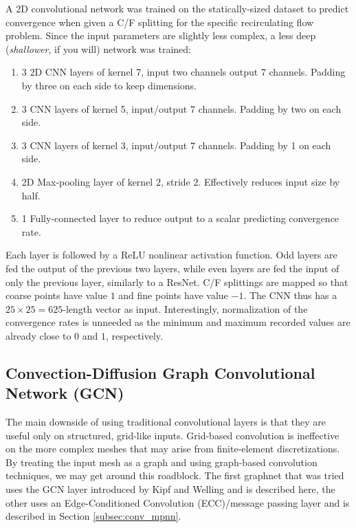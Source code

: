 \documentclass[review]{siamart190516}
\begin{document}
A 2D convolutional network was trained on the statically-sized dataset to predict convergence when given a C/F splitting for the specific recirculating flow problem.  Since the input parameters are slightly less complex, a less deep (\textit{shallower}, if you will) network was trained:

\begin{enumerate}
\item 3 2D CNN layers of kernel 7, input two channels output 7 channels.  Padding by three on each side to keep dimensions.
\item 3 CNN layers of kernel 5, input/output 7 channels.  Padding by two on each side.
\item 3 CNN layers of kernel 3, input/output 7 channels.  Padding by 1 on each side.
\item 2D Max-pooling layer of kernel 2, stride 2.  Effectively reduces input size by half.
\item 1 Fully-connected layer to reduce output to a scalar predicting convergence rate.
\end{enumerate}

Each layer is followed by a ReLU nonlinear activation function.  Odd layers are fed the output of the previous two layers, while even layers are fed the input of only the previous layer, similarly to a ResNet.  C/F splittings are mapped so that coarse points have value $1$ and fine points have value $-1$.  The CNN thus has a $25\times 25=625$-length vector as input.  Interestingly, normalization of the convergence rates is unneeded as the minimum and maximum recorded values are already close to $0$ and $1$, respectively.

\subsection{Convection-Diffusion Graph Convolutional Network (GCN)}\label{subsec:conv_gcn}

The main downside of using traditional convolutional layers is that they are useful only on structured, grid-like inputs.  Grid-based convolution is ineffective on the more complex meshes that may arise from finite-element discretizations.  By treating the input mesh as a graph and using graph-based convolution techniques, we may get around this roadblock.  The first graphnet that was tried uses the GCN layer introduced by Kipf and Welling\cite{gcn} and is described here, the other uses an Edge-Conditioned Convolution (ECC)/message passing layer and is described in Section \ref{subsec:conv_mpnn}.
\end{document}
